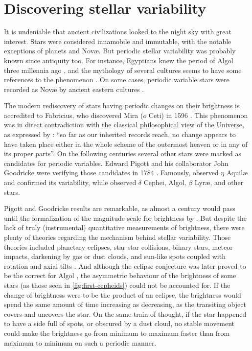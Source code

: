 \section{Discovering stellar variability \label{sec:intro-stellar-variability}}


It is undeniable that ancient civilizations looked to the night sky with great interest. 
Stars were considered innamobile and immutable, with the notable exceptions of planets and Nov\ae{}.
But periodic stellar variability was probably known since antiquity too.
For instance, Egyptians knew the period of Algol three millennia ago \citep{Jetsu2013,Jetsu2015},
and the mythology of several cultures seems to have some references to the phenomenon \citep{Wilk1996}. 
On some cases, periodic variable stars were recorded as Nov\ae{} by ancient eastern cultures \citep{HOPENGYOKE1962}.


The modern rediscovery of stars having periodic changes on their brightness is accredited to Fabricius, 
who discovered Mira ($o$ Ceti) in 1596 \citep{Hoffleit1997}.
This phenomenon was in direct contradiction with the classical philosophical view of the Universe, as expressed by \citet[book I, part 3]{aristotle}: 
\enquote{so far as our inherited records reach, no change appears to have taken place either in the whole scheme of the outermost heaven or in any of its proper parts}.
On the following centuries several other stars were marked as candidates for periodic variables.
Edward Pigott and his collaborator John Goodricke were verifying those candidates in 1784 \citep{Hoskin1979}. 
Famously, \cite{Pigott1785} observed $\eta$ Aquil\ae{} and confirmed its variability, 
while \cite{Goodricke1786} observed $\delta$ Cephei, Algol, $\beta$ Lyr\ae{}, and other stars.



Pigott and Goodricke results are remarkable, as almost a century would pass until the formalization of the magnitude scale for brightness by \cite{Pogson1856}.
But despite the lack of truly (instrumental) quantitative measurements of brightness, 
there were plenty of theories regarding the mechanism behind stellar variability. 
Those theories included planetary eclipses, star-star collisions, binary stars, meteor impacts, 
darkening by gas or dust clouds, and sun-like spots coupled with rotation and axial tilts \citep{Hoffleit1993}. 
And although the eclipse conjecture was later proved to be the correct for Algol \citep{Pickering1880}, 
the asymmetric behaviour of the brightness of some stars (as those seen in \autoref{fig:first-cepheids}) could not be accounted for.
If the change of brightness were to be the product of an eclipse,
the brightness would spend the same amount of time increasing as decreasing,
as the transiting object covers and uncovers the star.
On the same train of thought, if the star happened to have a side full of spots, or obscured by a dust cloud,
no stable movement could make the brightness go from minimum to maximum faster than from maximum to minimum on such a periodic manner.


